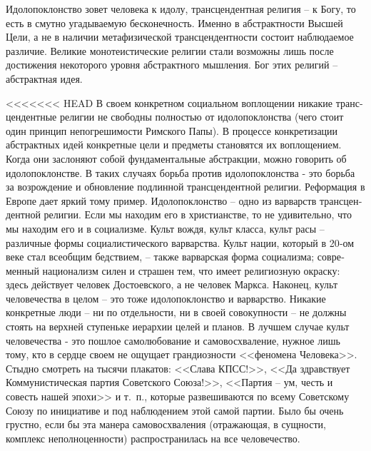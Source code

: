 \documentclass{book}
\begin{document}
Идолопоклонство зовет человека к идолу, трансцендентная религия -- к Богу, то есть в смутно угадываемую бесконечность. Именно в абстрактности Высшей Цели, а не в наличии мета­физической трансцендентности состоит наблюдаемое разли­чие. Великие монотеистические религии стали возможны лишь после достижения некоторого уровня абстрактного мышления. Бог этих религий -- абстрактная идея.

<<<<<<< HEAD
В своем конкретном социальном воплощении никакие транс­цендентные религии не свободны полностью от идолопоклонст­ва (чего стоит один принцип непогрешимости Римского Папы). В процессе конкретизации абстрактных идей конкретные цели и предметы становятся их воплощением. Когда они засло­няют собой фундаментальные абстракции, можно говорить об идолопоклонстве. В таких случаях борьба против идоло­поклонства ‑ это борьба за возрождение и обновление подлин­ной трансцендентной религии. Реформация в Европе дает яркий тому пример. Идолопоклонство -- одно из варварств трансцен­дентной религии. Если мы находим его в христианстве, то не удивительно, что мы находим его и в социализме. Культ вождя, культ класса, культ расы -- различные формы социалистиче­ского варварства. Культ нации, который в 20‑ом веке стал всеоб­щим бедствием, -- также варварская форма социализма; совре­менный национализм силен и страшен тем, что имеет религиоз­ную окраску: здесь действует человек Достоевского, а не чело­век Маркса. Наконец, культ человечества в целом -- это тоже идолопоклонство и варварство. Никакие конкретные люди -- ни по отдельности, ни в своей совокупности -- не должны стоять на верхней ступеньке иерархии целей и планов. В лучшем слу­чае культ человечества ‑ это пошлое самолюбование и само­восхваление, нужное лишь тому, кто в сердце своем не ощуща­ет грандиозности <<феномена Человека>>. Стыдно смотреть на тысячи плакатов: <<Слава КПСС!>>, <<Да здравствует Коммуни­стическая партия Советского Союза!>>, <<Партия -- ум, честь и совесть нашей эпохи>> и т.~п., которые развешиваются по всему Советскому Союзу по инициативе и под наблюдением этой са­мой партии. Было бы очень грустно, если бы эта манера само­восхваления (отражающая, в сущности, комплекс неполноцен­ности) распространилась на все человечество.
\end{document}
